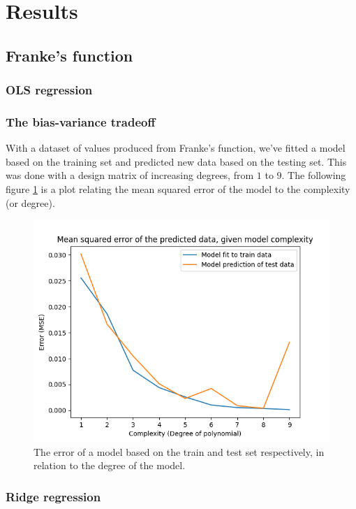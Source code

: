 \documentclass[../main.tex]{subfiles}
\begin{document}
\section{Results}\label{sec:results}
\subsection{Franke's function}

\subsubsection{OLS regression}
\subsubsection{The bias-variance tradeoff}
With a dataset of values produced from Franke's function, we've fitted a model based on the training set and predicted new data based on the testing set. This was done with a design matrix of increasing degrees, from $1$ to $9$. The following figure \ref{fig:result_complexity} is a plot relating the mean squared error of the model to the complexity (or degree).

\begin{figure}[h]
    \centering
    \includegraphics[width=\textwidth]{../assets/complexity.png}
    \caption{The error of a model based on the train and test set respectively, in relation to the degree of the model.}
    \label{fig:result_complexity}
\end{figure}

\subsubsection{Ridge regression}
\end{document}
